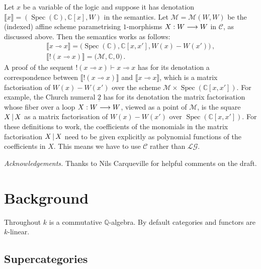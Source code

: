 \documentclass[english,letter paper,12pt,leqno]{article}
\theoremstyle{example}
\numberwithin{equation}{section}
\def\LG{\mathcal{LG}}
\def\nC{\mathds{C}}
\def\L{\mathcal{C}}
\DeclareMathOperator{\Spec}{Spec}
\begin{document}
Let $x$ be a variable of the logic and suppose it has denotation $\llbracket x \rrbracket = (\Spec(\nC), \nC[x], W)$ in the semantics. Let $\mathscr{M} = \mathscr{M}(W,W)$ be the (indexed) affine scheme parametrising $1$-morphisms $X: W \longrightarrow W$ in $\L$, as discussed above. Then the semantics works as follows:
\begin{gather*}
\llbracket x \multimap x \rrbracket = \big(\Spec(\nC), \nC[x,x'], W(x) - W(x') \big)\,,\\
\llbracket {!}( x \multimap x ) \rrbracket = \big( \mathscr{M}, \nC, 0 \big)\,.
\end{gather*}
A proof of the sequent ${!}(x \multimap x) \vdash x \multimap x$ has for its denotation a correspondence between $\llbracket {!}( x \multimap x ) \rrbracket$ and $\llbracket x \multimap x \rrbracket$, which is a matrix factorisation of $W(x) - W(x')$ over the scheme $\mathscr{M} \times \Spec(\nC[x,x'])$. For example, the Church numeral $\underline{2}$ has for its denotation the matrix factorisation whose fiber over a loop $X: W \longrightarrow W$, viewed as a point of $\mathscr{M}$, is the square $X \,|\, X$ as a matrix factorisation of $W(x) - W(x')$ over $\Spec(\nC[x,x'])$. For these definitions to work, the coefficients of the monomials in the matrix factorisation $X \,|\, X$ need to be given explicitly as polynomial functions of the coefficients in $X$. This means we have to use $\L$ rather than $\LG$.

\medskip

\emph{Acknowledgements.} Thanks to Nils Carqueville for helpful comments on the draft.%

\section{Background}\label{section:background}

Throughout $k$ is a commutative $\mathbb{Q}$-algebra. By default categories and functors are $k$-linear.

\subsection{Supercategories}
\end{document}
